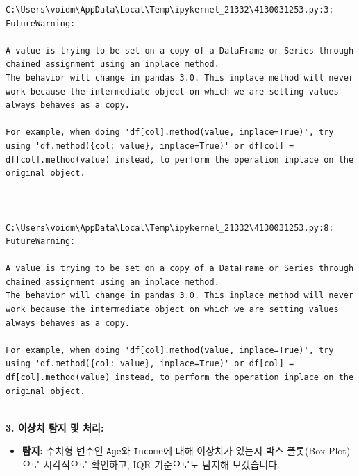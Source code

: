 \documentclass[
  letterpaper,
]{book}
\providecommand{\tightlist}{%
  \setlength{\itemsep}{0pt}\setlength{\parskip}{0pt}}
\begin{document}
\begin{verbatim}
C:\Users\voidm\AppData\Local\Temp\ipykernel_21332\4130031253.py:3: FutureWarning:

A value is trying to be set on a copy of a DataFrame or Series through chained assignment using an inplace method.
The behavior will change in pandas 3.0. This inplace method will never work because the intermediate object on which we are setting values always behaves as a copy.

For example, when doing 'df[col].method(value, inplace=True)', try using 'df.method({col: value}, inplace=True)' or df[col] = df[col].method(value) instead, to perform the operation inplace on the original object.



C:\Users\voidm\AppData\Local\Temp\ipykernel_21332\4130031253.py:8: FutureWarning:

A value is trying to be set on a copy of a DataFrame or Series through chained assignment using an inplace method.
The behavior will change in pandas 3.0. This inplace method will never work because the intermediate object on which we are setting values always behaves as a copy.

For example, when doing 'df[col].method(value, inplace=True)', try using 'df.method({col: value}, inplace=True)' or df[col] = df[col].method(value) instead, to perform the operation inplace on the original object.


\end{verbatim}

\textbf{3. 이상치 탐지 및 처리:}

\begin{itemize}
\tightlist
\item
  \textbf{탐지:} 수치형 변수인 \texttt{Age}와 \texttt{Income}에 대해
  이상치가 있는지 박스 플롯(Box Plot)으로 시각적으로 확인하고, IQR
  기준으로도 탐지해 보겠습니다.
\end{itemize}
\end{document}
